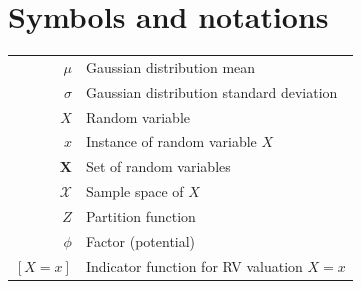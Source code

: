 {\let\cleardoublepage\relax{} \chapter*{Symbols and notations}}
\begin{tabular}{rl}
  $\mu$ & Gaussian distribution mean\\
  $\sigma$ & Gaussian distribution standard deviation\\
  $X$ & Random variable\\
  $x$ & Instance of random variable $X$\\
  $\mathbf{X}$ & Set of random variables\\
  $\mathcal{X}$ & Sample space of $X$\\
  $Z$ & Partition function\\
  $\phi$ & Factor (potential)\\
  $[X=x]$ & Indicator function for RV valuation $X=x$\\
\end{tabular}

\listoffigures

\listoftables

\tableofcontents
